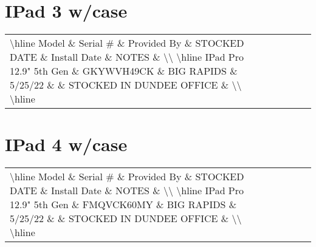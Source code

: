 \documentclass{article}%
\begin{document}
%
\section{IPad 3 w/case}%
\label{sec:IPad3w/case}%
\begin{tabularx}{\textwidth}{|X|X|X|X|X|X|X|}%
\textbackslash{}hline%
Model \& Serial \# \& Provided By \& STOCKED DATE \& Install Date \& NOTES \&  \textbackslash{}\textbackslash{}%
\textbackslash{}hline%
IPad Pro 12.9" 5th Gen \& GKYWVH49CK \& BIG RAPIDS \& 5/25/22 \&  \& STOCKED IN DUNDEE OFFICE \&  \textbackslash{}\textbackslash{}%
\textbackslash{}hline%
\end{tabularx}

%
\section{IPad 4 w/case}%
\label{sec:IPad4w/case}%
\begin{tabularx}{\textwidth}{|X|X|X|X|X|X|X|}%
\textbackslash{}hline%
Model \& Serial \# \& Provided By \& STOCKED DATE \& Install Date \& NOTES \&  \textbackslash{}\textbackslash{}%
\textbackslash{}hline%
IPad Pro 12.9" 5th Gen \& FMQVCK60MY \& BIG RAPIDS \& 5/25/22 \&  \& STOCKED IN DUNDEE OFFICE \&  \textbackslash{}\textbackslash{}%
\textbackslash{}hline%
\end{tabularx}

%
\end{document}
